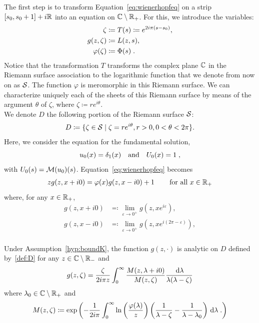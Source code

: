 The first step is to transform Equation~\eqref{eq:wienerhopfeq} on a strip $[s_0, s_0+1] + i \mathbb{R}$ into an equation on $\mathbb{C} \setminus \mathbb{R}_+$. For this, we introduce the variables:
    \begin{align}
        \zeta & \coloneqq T(s) \coloneqq e^{2i\pi(s-s_0)}, \label{def:zeta}\\
        g(z,\zeta) &\coloneqq L(z,s), \label{def:g} \\
        \varphi(\zeta) &\coloneqq \Phi(s) \; .
        \label{def:Phi}
    \end{align}
Notice that the transformation $T$ transforms the complex plane $\mathbb{C}$ in the Riemann surface association to the logarithmic function that we denote from now on as $\mathcal{S}$. The function $\varphi$ is meromorphic in this Riemann surface. We can characterize uniquely each of the sheets of this Riemann surface by means of the argument $\theta$ of $\zeta$, where $\zeta \coloneqq re^{i\theta}$. \\
We denote $D$ the following portion of the Riemann surface $\mathcal{S}$:
\begin{equation}\label{def:D}
D \coloneqq \{ \zeta \in \mathcal{S} \mid \zeta = re^{i\theta}, r > 0, 0 < \theta < 2\pi \}.
\end{equation}
Here, we consider the equation for the fundamental solution, \ie 
$$u_0(x) = \delta_1(x) \quad \text{and} \quad U_0(x) = 1 \; ,$$
with $U_0(s) = \mathcal{M}(u_0)(s)$. 
Equation~\eqref{eq:wienerhopfeq} becomes
\begin{align}
    \label{eq:WH3.5}
    z g(z, x+i0) = \varphi(x)g(z, x-i0) + 1 \, \qquad \text{for all $x\in\mathbb{R}_+$}
\end{align}
where, for any $x \in \mathbb{R}_+$, 
\begin{align*}
    g(z, x+i0) &\eqqcolon \lim_{\varepsilon\to 0^+}  g(z, xe^{i\varepsilon}),\\
    g(z, x-i0) &\eqqcolon \lim_{\varepsilon\to 0^+}  g(z, xe^{i(2\pi-\varepsilon)}),\\
\end{align*}
\begin{proposition}
\label{p:explicit_g}
Under Assumption~\ref{hyp:boundK}, the function $g(z, \cdot)$ is analytic on $D$ defined by~\eqref{def:D} for any $z \in \mathbb{C} \setminus \mathbb{R}_-$ and
\begin{align*}
    g(z,\zeta) 
    &= 
    \frac{\zeta}{2i\pi z}\int_0^\infty  \frac{M(z,\lambda+i0)}{M(z,\zeta)} \frac{\,\mathrm{d} \lambda}{\lambda(\lambda-\zeta)} \\
\end{align*}
where $\lambda_0 \in \mathbb{C} \setminus \mathbb{R}_+$ and 
$$ M(z, \zeta) \coloneqq \exp\left(-{\frac{1}{2i\pi  }\int_0^\infty \ln\left(\frac{\varphi(\lambda)}{z}\right) \left( \frac{1}{\lambda-\zeta} - \frac{1}{\lambda-\lambda_0}\right) \,\mathrm{d} \lambda} \; .\right)$$ 
\end{proposition}
